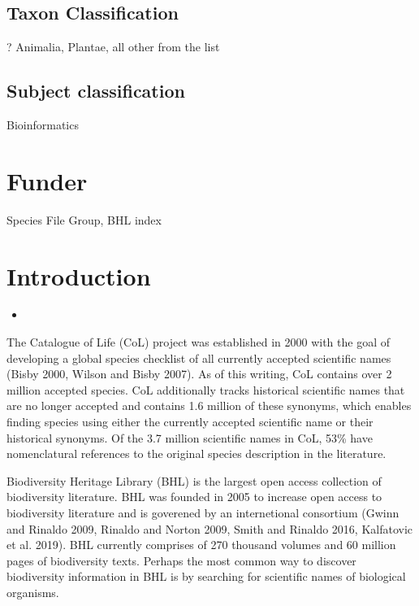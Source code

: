 \documentclass[
]{article}
\providecommand{\tightlist}{%
  \setlength{\itemsep}{0pt}\setlength{\parskip}{0pt}}
\begin{document}
\hypertarget{taxon-classification}{%
\subsection{Taxon Classification}\label{taxon-classification}}

? Animalia, Plantae, all other from the list

\hypertarget{subject-classification}{%
\subsection{Subject classification}\label{subject-classification}}

Bioinformatics

\hypertarget{funder}{%
\section{Funder}\label{funder}}

Species File Group, BHL index

\hypertarget{introduction}{%
\section{Introduction}\label{introduction}}

\begin{itemize}
\item
\end{itemize}

The Catalogue of Life (CoL) project was established in 2000 with the
goal of developing a global species checklist of all currently accepted
scientific names (Bisby 2000, Wilson and Bisby 2007). As of this
writing, CoL contains over 2 million accepted species. CoL additionally
tracks historical scientific names that are no longer accepted and
contains 1.6 million of these synonyms, which enables finding species
using either the currently accepted scientific name or their historical
synonyms. Of the 3.7 million scientific names in CoL, 53\% have
nomenclatural references to the original species description in the
literature.

Biodiversity Heritage Library (BHL) is the largest open access
collection of biodiversity literature. BHL was founded in 2005 to
increase open access to biodiversity literature and is goverened by an
internetional consortium (Gwinn and Rinaldo 2009, Rinaldo and Norton
2009, Smith and Rinaldo 2016, Kalfatovic et al. 2019). BHL currently
comprises of 270 thousand volumes and 60 million pages of biodiversity
texts. Perhaps the most common way to discover biodiversity information
in BHL is by searching for scientific names of biological organisms.
\end{document}
